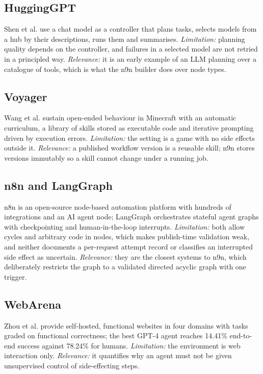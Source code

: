 \documentclass[conference]{IEEEtran}
\begin{document}
\subsection{HuggingGPT}
Shen et al. \cite{shen2023hugginggpt} use a chat model as a controller that plans tasks, selects models from a hub by their descriptions, runs them and summarises. \emph{Limitation:} planning quality depends on the controller, and failures in a selected model are not retried in a principled way. \emph{Relevance:} it is an early example of an LLM planning over a catalogue of tools, which is what the n9n builder does over node types.

\subsection{Voyager}
Wang et al. \cite{wang2023voyager} sustain open-ended behaviour in Minecraft with an automatic curriculum, a library of skills stored as executable code and iterative prompting driven by execution errors. \emph{Limitation:} the setting is a game with no side effects outside it. \emph{Relevance:} a published workflow version is a reusable skill; n9n stores versions immutably so a skill cannot change under a running job.

\subsection{n8n and LangGraph}
n8n \cite{n8n} is an open-source node-based automation platform with hundreds of integrations and an AI agent node; LangGraph \cite{langgraph} orchestrates stateful agent graphs with checkpointing and human-in-the-loop interrupts. \emph{Limitation:} both allow cycles and arbitrary code in nodes, which makes publish-time validation weak, and neither documents a per-request attempt record or classifies an interrupted side effect as uncertain. \emph{Relevance:} they are the closest systems to n9n, which deliberately restricts the graph to a validated directed acyclic graph with one trigger.

\subsection{WebArena}
Zhou et al. \cite{zhou2024webarena} provide self-hosted, functional websites in four domains with tasks graded on functional correctness; the best GPT-4 agent reaches 14.41\% end-to-end success against 78.24\% for humans. \emph{Limitation:} the environment is web interaction only. \emph{Relevance:} it quantifies why an agent must not be given unsupervised control of side-effecting steps.
\end{document}
